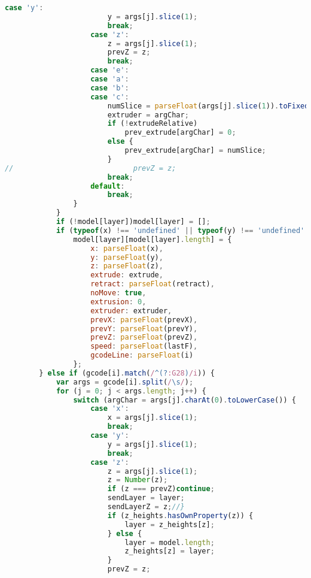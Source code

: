 \begin{lstlisting}[language=JavaScript, label={lst:Worker}, caption=Workerjs is the core gcode to D3 line processor.]
                    case 'y':
                        y = args[j].slice(1);
                        break;
                    case 'z':
                        z = args[j].slice(1);
                        prevZ = z;
                        break;
                    case 'e':
                    case 'a':
                    case 'b':
                    case 'c':
                        numSlice = parseFloat(args[j].slice(1)).toFixed(3);
                        extruder = argChar;
                        if (!extrudeRelative)
                            prev_extrude[argChar] = 0;
                        else {
                            prev_extrude[argChar] = numSlice;
                        }
//                            prevZ = z;
                        break;
                    default:
                        break;
                }
            }
            if (!model[layer])model[layer] = [];
            if (typeof(x) !== 'undefined' || typeof(y) !== 'undefined' || typeof(z) !== 'undefined')
                model[layer][model[layer].length] = {
                    x: parseFloat(x),
                    y: parseFloat(y),
                    z: parseFloat(z),
                    extrude: extrude,
                    retract: parseFloat(retract),
                    noMove: true,
                    extrusion: 0,
                    extruder: extruder,
                    prevX: parseFloat(prevX),
                    prevY: parseFloat(prevY),
                    prevZ: parseFloat(prevZ),
                    speed: parseFloat(lastF),
                    gcodeLine: parseFloat(i)
                };
        } else if (gcode[i].match(/^(?:G28)/i)) {
            var args = gcode[i].split(/\s/);
            for (j = 0; j < args.length; j++) {
                switch (argChar = args[j].charAt(0).toLowerCase()) {
                    case 'x':
                        x = args[j].slice(1);
                        break;
                    case 'y':
                        y = args[j].slice(1);
                        break;
                    case 'z':
                        z = args[j].slice(1);
                        z = Number(z);
                        if (z === prevZ)continue;
                        sendLayer = layer;
                        sendLayerZ = z;//}
                        if (z_heights.hasOwnProperty(z)) {
                            layer = z_heights[z];
                        } else {
                            layer = model.length;
                            z_heights[z] = layer;
                        }
                        prevZ = z;

\end{lstlisting}
